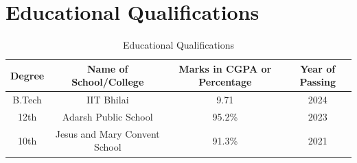 \documentclass{article}
\begin{document}
	\section{Educational Qualifications}
	\begin{table}[H]
		\centering
		\caption{Educational Qualifications}
		\begin{tabular}{|c|c|c|c|}
			\hline
			\textbf{Degree} & \textbf{Name of School/College} & \textbf{Marks in CGPA or Percentage} & \textbf{Year of Passing} \\
			\hline
			B.Tech & IIT Bhilai & 9.71 & 2024 \\
			\hline
			12th & Adarsh Public School & 95.2\% & 2023 \\
			\hline
			10th & Jesus and Mary Convent School & 91.3\% & 2021 \\
			\hline
		\end{tabular}
	\end{table}
	
	
\end{document}
